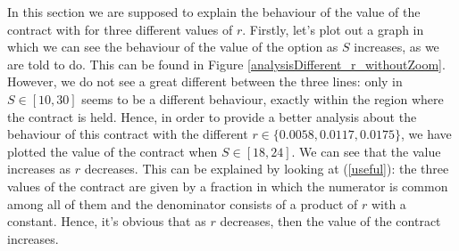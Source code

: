 In this section we are supposed to explain the behaviour of the value of the contract with for three different values of $r$. Firstly, let's plot out a graph in which we can see the behaviour of the value of the option as $S$ increases, as we are told to do. This can be found in Figure \ref{analysisDifferent_r_withoutZoom}. However, we do not see a great different between the three lines: only in $S\in[10,30]$ seems to be a different behaviour, exactly within the region where the contract is held. Hence, in order to provide a better analysis about the behaviour of this contract with the different $r\in\{0.0058,0.0117,0.0175\}$, we have plotted the value of the contract when $S\in[18,24]$. We can see that the value increases as $r$ decreases. This can be explained by looking at (\ref{useful}): the three values of the contract are given by a fraction in which the numerator is common among all of them and the denominator consists of a product of $r$ with a constant. Hence, it's obvious that as $r$ decreases, then the value of the contract increases.

